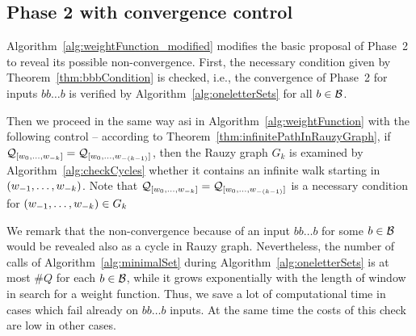 \subsection*{Phase 2 with convergence control}
Algorithm~\ref{alg:weightFunction_modified} modifies the basic proposal of Phase~2 to reveal its possible non-convergence. First, the necessary condition given by Theorem~\ref{thm:bbbCondition} is checked, i.e., the convergence of Phase~2 for inputs $bb\dots b$ is verified by Algorithm~\ref{alg:oneletterSets} for all $b\in\mathcal{B}$. 

Then we proceed in the same way asi in Algorithm~\ref{alg:weightFunction} with the following control -- according to Theorem~\ref{thm:infinitePathInRauzyGraph}, if $\mathcal{Q}_{[w_{0}, \dots, w_{-k}]} = \mathcal{Q}_{[w_{0}, \dots, w_{-(k-1)}]}$, then the Rauzy graph $G_k$ is examined by Algorithm~\ref{alg:checkCycles} whether it contains an infinite walk starting in $(w_{-1}, \dots, w_{-k})$. Note that $\mathcal{Q}_{[w_{0}, \dots, w_{-k}]} = \mathcal{Q}_{[w_{0}, \dots, w_{-(k-1)}]}$ is a necessary condition for  $(w_{-1}, \dots, w_{-k})\in G_k$

We remark that the non-convergence because of an input $bb\dots b$ for some $b\in\mathcal{B}$ would be revealed also as a cycle in Rauzy graph. Nevertheless, the number of calls of Algorithm~\ref{alg:minimalSet} during Algorithm~\ref{alg:oneletterSets} is at most $\#Q$ for each $b\in\mathcal{B}$, while it grows exponentially with the length of window in search for a weight function. Thus, we save a lot of computational time in cases which fail already on $bb\dots b$ inputs. At the same time the costs of this check are low in other cases.

